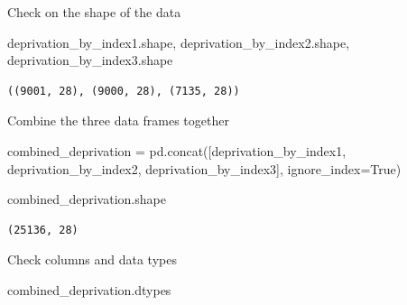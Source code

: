 \documentclass[
  letterpaper,
  DIV=11,
  numbers=noendperiod]{scrartcl}
\newenvironment{Shaded}{\begin{snugshade}}{\end{snugshade}}
\newcommand{\NormalTok}[1]{\textcolor[rgb]{0.00,0.23,0.31}{#1}}
\newcommand{\OperatorTok}[1]{\textcolor[rgb]{0.37,0.37,0.37}{#1}}
\newcommand{\VariableTok}[1]{\textcolor[rgb]{0.07,0.07,0.07}{#1}}
\begin{document}
Check on the shape of the data

\begin{Shaded}
\begin{Highlighting}[]
\NormalTok{deprivation\_by\_index1.shape, deprivation\_by\_index2.shape, deprivation\_by\_index3.shape}
\end{Highlighting}
\end{Shaded}

\begin{verbatim}
((9001, 28), (9000, 28), (7135, 28))
\end{verbatim}

Combine the three data frames together

\begin{Shaded}
\begin{Highlighting}[]
\NormalTok{combined\_deprivation }\OperatorTok{=}\NormalTok{ pd.concat([deprivation\_by\_index1, deprivation\_by\_index2, deprivation\_by\_index3], ignore\_index}\OperatorTok{=}\VariableTok{True}\NormalTok{)}

\NormalTok{combined\_deprivation.shape}
\end{Highlighting}
\end{Shaded}

\begin{verbatim}
(25136, 28)
\end{verbatim}

Check columns and data types

\begin{Shaded}
\begin{Highlighting}[]
\NormalTok{combined\_deprivation.dtypes}
\end{Highlighting}
\end{Shaded}
\end{document}
